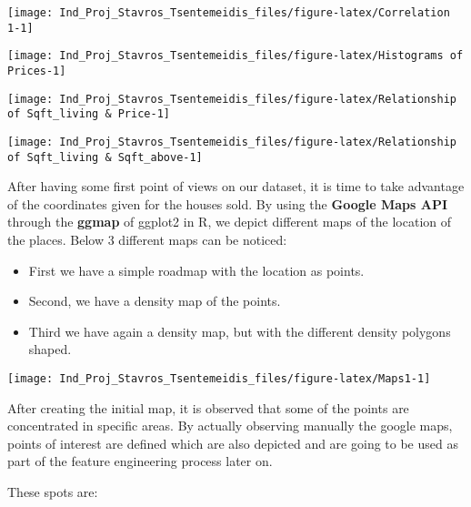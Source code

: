 \documentclass[]{article}
\providecommand{\tightlist}{%
  \setlength{\itemsep}{0pt}\setlength{\parskip}{0pt}}
\begin{document}
\begin{center}\texttt{[image: Ind\_Proj\_Stavros\_Tsentemeidis\_files/figure-latex/Correlation 1-1]} \end{center}

\begin{center}\texttt{[image: Ind\_Proj\_Stavros\_Tsentemeidis\_files/figure-latex/Histograms of Prices-1]} \end{center}

\begin{center}\texttt{[image: Ind\_Proj\_Stavros\_Tsentemeidis\_files/figure-latex/Relationship of Sqft\_living \& Price-1]} \end{center}

\begin{center}\texttt{[image: Ind\_Proj\_Stavros\_Tsentemeidis\_files/figure-latex/Relationship of Sqft\_living \& Sqft\_above-1]} \end{center}

 After having some first point of views on our dataset, it is time to
take advantage of the coordinates given for the houses sold. By using
the \textbf{Google Maps API} through the \textbf{ggmap} of ggplot2 in R,
we depict different maps of the location of the places. Below 3
different maps can be noticed:

\begin{itemize}
\tightlist
\item
  First we have a simple roadmap with the location as points.
\item
  Second, we have a density map of the points.
\item
  Third we have again a density map, but with the different density
  polygons shaped.
\end{itemize}

\begin{center}\texttt{[image: Ind\_Proj\_Stavros\_Tsentemeidis\_files/figure-latex/Maps1-1]} \end{center}

 After creating the initial map, it is observed that some of the points
are concentrated in specific areas. By actually observing manually the
google maps, points of interest are defined which are also depicted and
are going to be used as part of the feature engineering process later
on.

These spots are:
\end{document}
